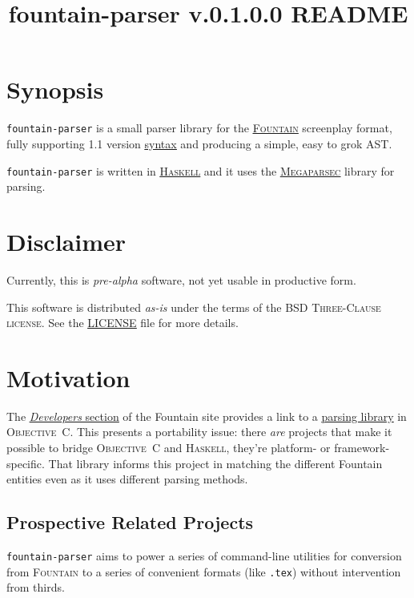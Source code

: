 \documentclass[11pt]{article}
\newcommand{\link}[2]{\underline{\color{darkblue}\href{#1}{#2}}}
\begin{document}
\title{fountain-parser v.0.1.0.0 README}
\author{}
\date{}
\maketitle

\section*{Synopsis} \texttt{fountain-parser} is a small parser library
for the \link{https://fountain.io/}{\textsc{Fountain}} screenplay
format, fully supporting 1.1 version
\link{https://fountain.io/syntax/}{syntax} and producing a simple, easy
to grok \textsc{AST}.

\texttt{fountain-parser} is written in
\link{https://haskell.org}{\textsc{Haskell}} and it uses the
\link{https://hackage.haskell.org/package/megaparsec}{\textsc{Megaparsec}}
library for parsing.

\section*{Disclaimer}
Currently, this is \emph{pre-alpha} software, not yet usable in
productive form.

This software is distributed \emph{as-is} under the terms of the
\textsc{BSD Three-Clause license}.  See the
\link{run:./LICENSE}{LICENSE} file for more details.

\section*{Motivation} The
\link{https://fountain.io/developers/}{\emph{Developers} section} of the
Fountain site provides a link to a
\link{https://github.com/nyousefi/Fountain}{parsing library} in
\textsc{Objective~C}. This presents a portability issue: there
\emph{are} projects that make it possible to bridge \textsc{Objective~C}
and \textsc{Haskell}, they’re platform- or framework-specific.  That
library informs this project in matching the different Fountain entities
even as it uses different parsing methods.

\subsection*{Prospective Related Projects}
\texttt{fountain-parser} aims to power a series of command-line
utilities for conversion from \textsc{Fountain} to a series of
convenient formats (like \texttt{.tex}) without intervention
from thirds.
\end{document}
